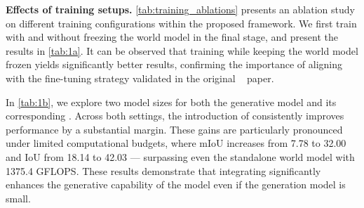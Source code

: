 \textbf{Effects of training setups.}
\cref{tab:training_ablations} presents an ablation study on different training configurations within the proposed \mtd{} framework. 
We first train \ctln{} with and without freezing the world model in the final stage, and present the results in \cref{tab:1a}. 
It can be observed that training \ctln{} while keeping the world model frozen yields significantly better results, confirming the importance of aligning with the fine-tuning strategy validated in the original \ctln{}~\cite{controlnet} paper.

In \cref{tab:1b}, we explore two model sizes for both the generative model and its corresponding \ctln{}. 
Across both settings, the introduction of \ctln{} consistently improves performance by a substantial margin. 
These gains are particularly pronounced under limited computational budgets, where mIoU increases from 7.78 to 32.00 and IoU from 18.14 to 42.03 — surpassing even the standalone world model with 1375.4 GFLOPS. 
These results demonstrate that integrating \ctln{} significantly enhances the generative capability of the model even if the generation model is small.

